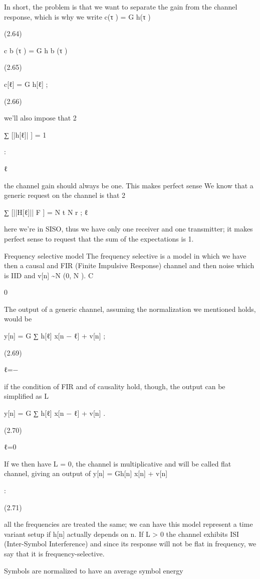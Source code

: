 {In short, the problem is that we want to separate the gain from the channel response,
which is why we write c(τ ) = \sqrt G h(τ )

(2.64)

c b (τ ) = \sqrt G h b (τ )

(2.65)

c[ℓ] = \sqrt G h[ℓ] ;

(2.66)

we'll also impose that 2

∑ [|h[ℓ]| ] = 1

:

ℓ

the channel gain should always be one.
​This makes perfect sense We know that a generic request on the channel is that 2

∑ [||H[ℓ]|| F ] = N t N r ;
ℓ

here we're in SISO, thus we have only one receiver and one transmitter; it makes perfect sense to request that the sum of the expectations is 1.

​Frequency selective model The frequency selective is a model in which we have \sqrtG then a causal and FIR (Finite Impulsive Response) channel and then noise which is IID and v[n] \sim N (0, N ).
C

0

The output of a generic channel, assuming the normalization we mentioned holds,
would be
\infty

y[n] = \sqrt G ∑ h[ℓ] x[n − ℓ] + v[n] ;

(2.69)

ℓ=−\infty

if the condition of FIR and of causality hold, though, the output can be simplified as L

y[n] = \sqrt G ∑ h[ℓ] x[n − ℓ] + v[n] .

(2.70)

ℓ=0

If we then have L = 0, the channel is multiplicative and will be called flat channel, giving an output of y[n] = \sqrt Gh[n] x[n] + v[n]

:

(2.71)

all the frequencies are treated the same; we can have this model represent a time variant setup if h[n] actually depends on n.
If L > 0 the channel exhibits ISI (Inter-Symbol Interference) and since its response will not be flat in frequency, we say that it is frequency-selective.

Symbols are normalized to have an average symbol energy

}
